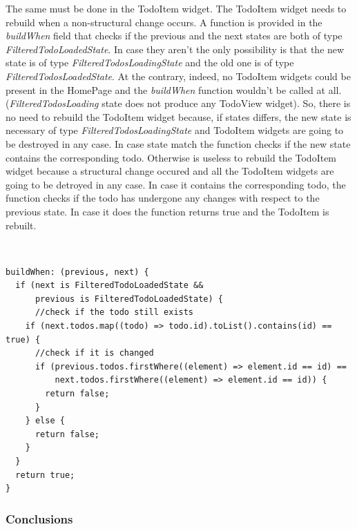 The same must be done in the TodoItem widget. The TodoItem widget needs to rebuild when a non-structural change occurs. A function is provided in the \textit{buildWhen} field that checks if the previous and the next states are both of type \textit{FilteredTodoLoadedState}. In case they aren’t the only possibility is that the new state is of type \textit{FilteredTodosLoadingState} and the old one is of type \textit{FilteredTodosLoadedState}. At the contrary, indeed, no TodoItem widgets could be present in the HomePage and the \textit{buildWhen }function wouldn't be called at all. (\textit{FilteredTodosLoading} state does not produce any TodoView widget). So, there is no need to rebuild the TodoItem widget because, if states differs, the new state is necessary of type \textit{FilteredTodosLoadingState} and  TodoItem widgets are going to be destroyed in any case. In case state match the function checks if the new state contains the corresponding todo. Otherwise is useless to rebuild the TodoItem widget because a structural change occured and all the TodoItem widgets are going to be detroyed in any case. In case it contains the corresponding todo, the function checks if the todo has undergone any changes with respect to the previous state. In case it does the function returns true and the  TodoItem is rebuilt.
\begin{code}
\mbox{}\\
 \mbox{}
\label{code:2.14}
\begin{verbatim}
buildWhen: (previous, next) {
  if (next is FilteredTodoLoadedState &&
      previous is FilteredTodoLoadedState) {
      //check if the todo still exists
    if (next.todos.map((todo) => todo.id).toList().contains(id) == true) {
      //check if it is changed
      if (previous.todos.firstWhere((element) => element.id == id) ==
          next.todos.firstWhere((element) => element.id == id)) {
        return false;
      }
    } else {
      return false;
    }
  }
  return true;
}
\end{verbatim}
\mbox{}
\end{code}




\subsubsection{Conclusions} \mbox{} \\
\label{subpar:render_optimizations_bloc}

